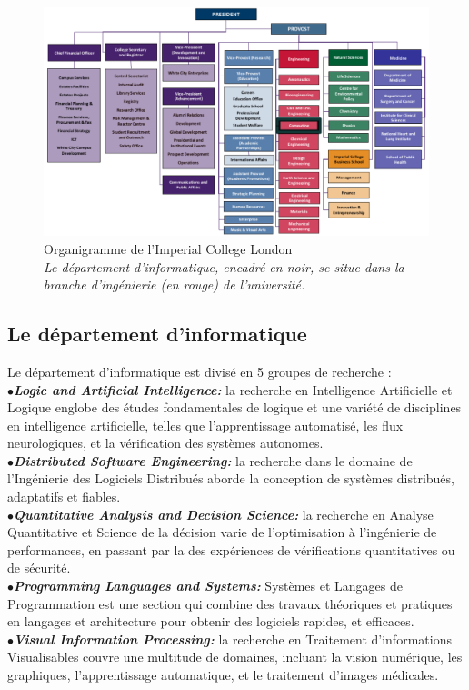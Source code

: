 \documentclass[10pt]{report}
\begin{document}
	\begin{figure}[h!]
		\begin{center}
			\includegraphics[width=18cm]{Reports/figures/College-Organisation.pdf}
		\end{center}
		\caption[Organigramme de l'Imperial College London]{Organigramme de l'Imperial College London \\ \textit{Le département d'informatique, encadré en noir, se situe dans la branche d'ingénierie (en rouge) de l'université.}}
		\label{Organigramme de l'Imperial College London}
	\end{figure}
	
	\subsection{Le département d'informatique}
	
	Le département d'informatique est divisé en 5 groupes de recherche : 
	\\{$\bullet$}\textit{\textbf{Logic and Artificial Intelligence:}} la recherche en Intelligence Artificielle et Logique englobe des études fondamentales de logique et une variété de disciplines en intelligence artificielle, telles que l'apprentissage automatisé, les flux neurologiques, et la vérification des systèmes autonomes.
	\\{$\bullet$}\textit{\textbf{Distributed Software Engineering:}} la recherche dans le domaine de l'Ingénierie des Logiciels Distribués aborde la conception de systèmes distribués, adaptatifs et fiables.
	\\{$\bullet$}\textit{\textbf{Quantitative Analysis and Decision Science:}} la recherche en Analyse Quantitative et Science de la décision varie de l'optimisation à l'ingénierie de performances, en passant par la des expériences de vérifications quantitatives ou de sécurité.
	\\{$\bullet$}\textit{\textbf{Programming Languages and Systems:}} Systèmes et Langages de Programmation est une section qui combine des travaux théoriques et pratiques en langages et architecture pour obtenir des logiciels rapides, et efficaces.
	\\{$\bullet$}\textit{\textbf{Visual Information Processing:}} la recherche en Traitement d'informations Visualisables couvre une multitude de domaines, incluant la vision numérique, les graphiques, l'apprentissage automatique, et le traitement d'images médicales.
	 
\end{document}
